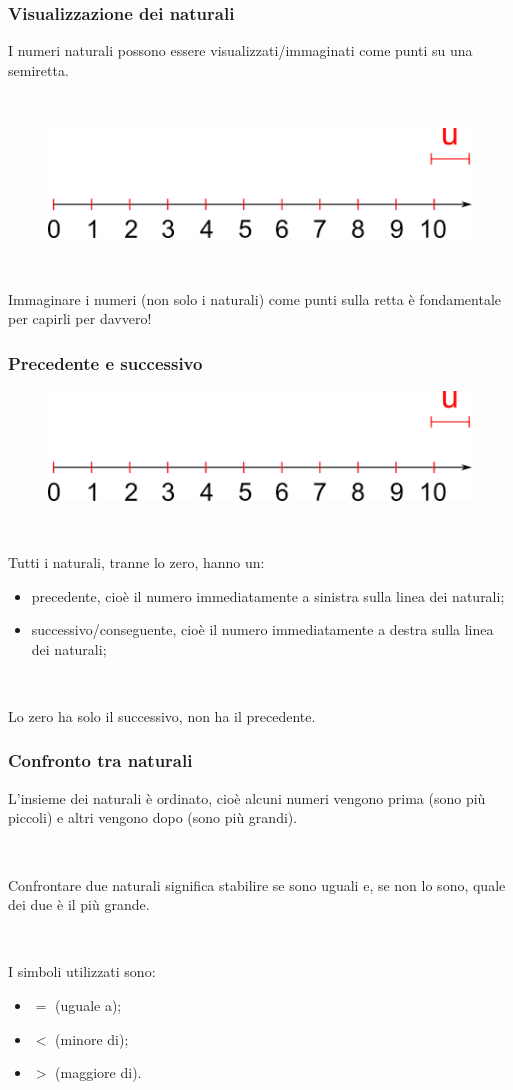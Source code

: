 \documentclass[handout]{beamer}
\theoremstyle{plain}
\begin{document}
\begin{frame}
\frametitle{Visualizzazione dei naturali}
I numeri naturali possono essere visualizzati/immaginati come punti su una \alert{semiretta}.

~

\begin{figure}
  \includegraphics[width=.8\columnwidth]{img/naturali.png}
\end{figure}\pause

~

Immaginare i numeri (non solo i naturali) come punti sulla retta è fondamentale per capirli per davvero!
\end{frame}


\begin{frame}
\frametitle{Precedente e successivo}
\begin{figure}
  \includegraphics[width=.6\columnwidth]{img/naturali.png}
\end{figure}

~

Tutti i naturali, tranne lo zero, hanno un:
\begin{itemize}
  \item \alert{precedente}, cioè il numero immediatamente a sinistra sulla linea dei naturali;\pause
  \item \alert{successivo/conseguente}, cioè il numero immediatamente a destra sulla linea dei naturali;\pause
\end{itemize}

~

Lo zero ha solo il successivo, non ha il precedente.
\end{frame}


\begin{frame}
\frametitle{Confronto tra naturali}
L'insieme dei naturali è \alert{ordinato}, cioè alcuni numeri vengono prima (sono più piccoli) e altri vengono dopo (sono più grandi).\pause

~

\alert{Confrontare due naturali} significa stabilire se sono uguali e, se non lo sono, quale dei due è il più grande.\pause

~

I simboli utilizzati sono: 
\begin{itemize}
  \item $ = $ (uguale a);
  \item $ < $ (minore di);
  \item $ > $ (maggiore di).
\end{itemize}  
\end{frame}
\end{document}
